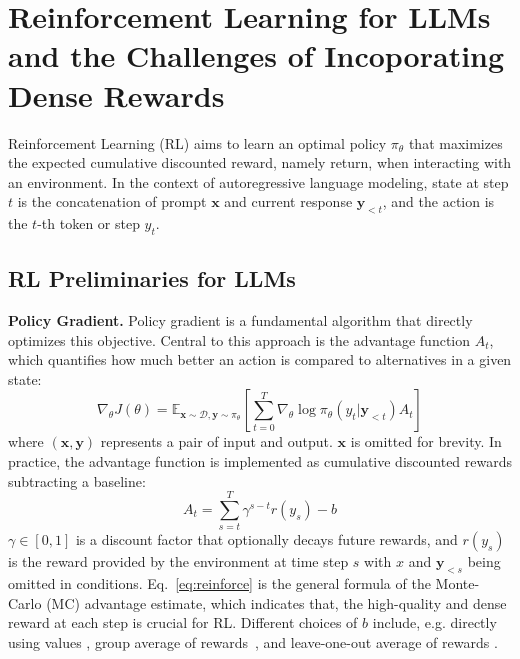 \section{Reinforcement Learning for LLMs and the Challenges of Incoporating Dense Rewards}


Reinforcement Learning (RL) aims to learn an optimal policy $\pi_\theta$ that maximizes the expected cumulative discounted reward, namely return, when interacting with an environment.
In the context of autoregressive language modeling, state at step $t$ is the concatenation of prompt $\mathbf{x}$ and current response $\mathbf{y}_{<t}$, and the action is the $t$-th token or step $y_t$.


\subsection{RL Preliminaries for LLMs}
\textbf{Policy Gradient.}
Policy gradient is a fundamental algorithm that directly optimizes this objective. Central to this approach is the advantage function $A_t$, which quantifies how much better an action is compared to alternatives in a given state:
\vspace{-10pt}
\begin{equation}
    \nabla_\theta J(\theta) = \mathbb{E}_{\mathbf{x} \sim \mathcal{D},\mathbf{y} \sim \pi_\theta}\left[\sum_{t=0}^{T} \nabla_\theta \log \pi_\theta(y_t|\mathbf{y}_{<t}) A_t\right]
\end{equation}
where $\left(\mathbf{x},\mathbf{y}\right)$ represents a pair of input and output. $\mathbf{x}$ is omitted for brevity. In practice, the advantage function is implemented as cumulative discounted rewards subtracting a baseline:
\begin{equation}
\label{eq:reinforce}
    A_t = \sum_{s=t}^T \gamma^{s-t} r(y_s) - b
\end{equation}
$\gamma \in [0,1]$ is a discount factor that optionally decays future rewards, and $r(y_s)$ is the reward provided by the environment at time step $s$ with $x$ and $\mathbf{y}_{<s}$ being omitted in conditions.
Eq.~\ref{eq:reinforce} is the general formula of the Monte-Carlo (MC) advantage estimate, which indicates that, the high-quality and dense reward at each step is crucial for RL.
Different choices of $b$ include, e.g. directly using values \citep{williams1992simple}, group average of rewards~\citep{deepseek-math}, and leave-one-out average of rewards \citep{ahmadian2024back, Kool2019Buy4R}.


